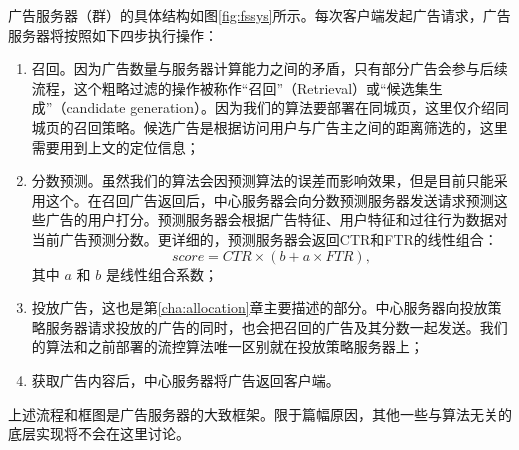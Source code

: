 广告服务器（群）的具体结构如图\ref{fig:fssys}所示。每次客户端发起广告请求，广告服务器将按照如下四步执行操作：
\begin{enumerate}
	\item 召回。因为广告数量与服务器计算能力之间的矛盾，只有部分广告会参与后续流程，这个粗略过滤的操作被称作“召回”（Retrieval）或“候选集生成”（candidate generation）。因为我们的算法要部署在同城页，这里仅介绍同城页的召回策略。候选广告是根据访问用户与广告主之间的距离筛选的，这里需要用到上文的定位信息；
	\item 分数预测。虽然我们的算法会因预测算法的误差而影响效果，但是目前只能采用这个。在召回广告返回后，中心服务器会向分数预测服务器发送请求预测这些广告的用户打分。预测服务器会根据广告特征、用户特征和过往行为数据对当前广告预测分数。更详细的，预测服务器会返回CTR和FTR的线性组合：
	\begin{equation}
		score = CTR \times  (b + a \times FTR), \label{eq:score}
	\end{equation}
	其中 $a$ 和 $b$ 是线性组合系数；
	\item 投放广告，这也是第\ref{cha:allocation}章主要描述的部分。中心服务器向投放策略服务器请求投放的广告的同时，也会把召回的广告及其分数一起发送。我们的算法和之前部署的流控算法唯一区别就在投放策略服务器上；
	\item 获取广告内容后，中心服务器将广告返回客户端。
\end{enumerate}

上述流程和框图是广告服务器的大致框架。限于篇幅原因，其他一些与算法无关的底层实现将不会在这里讨论。





